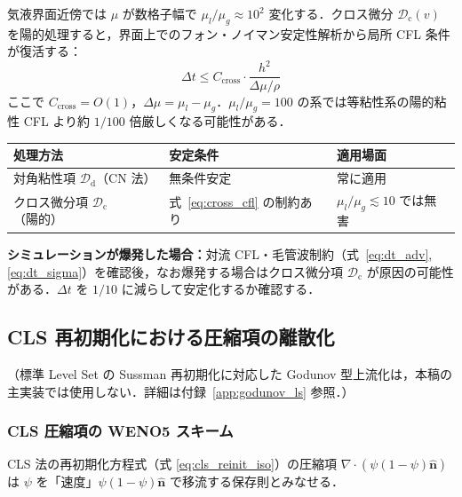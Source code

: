 \begin{tcolorbox}[warnbox, title={変粘性界面でのクロス微分陽的処理：粘性 CFL 条件の実質的復活}]
\label{warn:cross_cfl}

気液界面近傍では $\mu$ が数格子幅で $\mu_l/\mu_g \approx 10^2$ 変化する．クロス微分 $\mathcal{D}_{\mathrm{c}}(v)$ を陽的処理すると，界面上でのフォン・ノイマン安定性解析から局所 CFL 条件が復活する：
\begin{equation}
  \Delta t \le C_{\mathrm{cross}} \cdot \frac{h^2}{\Delta\mu / \rho}
  \label{eq:cross_cfl}
\end{equation}
ここで $C_{\mathrm{cross}} = O(1)$，$\Delta\mu = \mu_l - \mu_g$．$\mu_l/\mu_g = 100$ の系では等粘性系の陽的粘性 CFL より約 $1/100$ 倍厳しくなる可能性がある．

\begin{center}
\renewcommand{\arraystretch}{1.2}
\begin{tabular}{lll}
\hline
処理方法 & 安定条件 & 適用場面 \\
\hline
対角粘性項 $\mathcal{D}_{\mathrm{d}}$（CN 法） & 無条件安定 & 常に適用 \\
クロス微分項 $\mathcal{D}_{\mathrm{c}}$（陽的） & 式~\eqref{eq:cross_cfl} の制約あり & $\mu_l/\mu_g \lesssim 10$ では無害 \\
\hline
\end{tabular}
\end{center}

\textbf{シミュレーションが爆発した場合：}対流 CFL・毛管波制約（式~\eqref{eq:dt_adv},\eqref{eq:dt_sigma}）を確認後，なお爆発する場合はクロス微分項 $\mathcal{D}_{\mathrm{c}}$ が原因の可能性がある．$\Delta t$ を $1/10$ に減らして安定化するか確認する．
\end{tcolorbox}

\subsection{CLS 再初期化における圧縮項の離散化}

\noindent（標準 Level Set の Sussman 再初期化に対応した Godunov 型上流化は，本稿の主実装では使用しない．詳細は付録~\ref{app:godunov_ls} 参照．）

\subsubsection{CLS 圧縮項の WENO5 スキーム}
\label{sec:cls_compression}

CLS 法の再初期化方程式（式 \eqref{eq:cls_reinit_iso}）の圧縮項
$\nabla\cdot(\psi(1-\psi)\hat{\bm{n}})$
は $\psi$ を「速度」$\psi(1-\psi)\hat{\bm{n}}$ で移流する保存則とみなせる．

